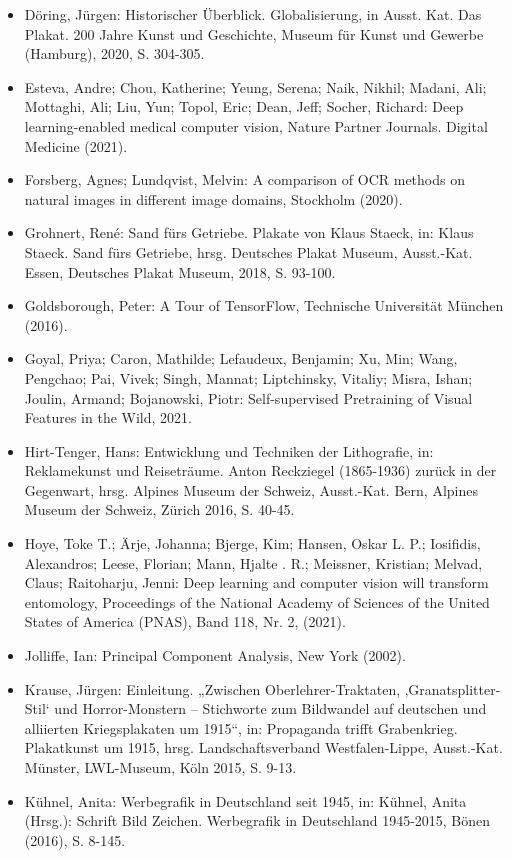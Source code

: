 \documentclass[a4paper,12pt,ngerman]{article}
\begin{document}
\begin{itemize}
	\item Döring, Jürgen: Historischer Überblick. Globalisierung, in Ausst. Kat. Das Plakat. 200 Jahre Kunst und Geschichte, Museum für Kunst und Gewerbe (Hamburg), 2020, S. 304-305.
	\item Esteva, Andre; Chou, Katherine; Yeung, Serena; Naik, Nikhil; Madani, Ali; Mottaghi, Ali; Liu, Yun; Topol, Eric; Dean, Jeff; Socher, Richard: Deep learning-enabled medical computer vision, Nature Partner Journals. Digital Medicine (2021). 
	\item Forsberg, Agnes; Lundqvist, Melvin: A comparison of OCR methods on natural images in different image domains, Stockholm (2020).
	\item Grohnert, René: Sand fürs Getriebe. Plakate von Klaus Staeck, in: Klaus Staeck. Sand fürs Getriebe, hrsg. Deutsches Plakat Museum, Ausst.-Kat. Essen, Deutsches Plakat Museum, 2018, S. 93-100.
	\item Goldsborough, Peter: A Tour of TensorFlow, Technische Universität München (2016).
	\item Goyal, Priya; Caron, Mathilde; Lefaudeux, Benjamin; Xu, Min; Wang, Pengchao; Pai, Vivek; Singh, Mannat; Liptchinsky, Vitaliy; Misra, Ishan; Joulin, Armand; Bojanowski, Piotr: Self-supervised Pretraining of Visual Features in the Wild, 2021. 
	\item Hirt-Tenger, Hans: Entwicklung und Techniken der Lithografie, in: Reklamekunst und Reiseträume. Anton Reckziegel (1865-1936) zurück in der Gegenwart, hrsg. Alpines Museum der Schweiz, Ausst.-Kat. Bern, Alpines Museum der Schweiz, Zürich 2016, S. 40-45.
	\item Hoye, Toke T.; Ärje, Johanna; Bjerge, Kim; Hansen, Oskar L. P.; Iosifidis, Alexandros; Leese, Florian; Mann, Hjalte . R.; Meissner, Kristian; Melvad, Claus; Raitoharju, Jenni: Deep learning and computer vision will transform entomology, Proceedings of the National Academy of Sciences of the United States of America (PNAS), Band 118, Nr. 2, (2021). 
	\item Jolliffe, Ian: Principal Component Analysis, New York (2002).
	\item Krause, Jürgen: Einleitung. „Zwischen Oberlehrer-Traktaten, ‚Granatsplitter-Stil‘ und Horror-Monstern – Stichworte zum Bildwandel auf deutschen und alliierten Kriegsplakaten um 1915“, in: Propaganda trifft Grabenkrieg. Plakatkunst um 1915, hrsg. Landschaftsverband Westfalen-Lippe, Ausst.-Kat. Münster, LWL-Museum, Köln 2015, S. 9-13.
	\item Kühnel, Anita: Werbegrafik in Deutschland seit 1945, in: Kühnel, Anita (Hrsg.): Schrift Bild Zeichen. Werbegrafik in Deutschland 1945-2015, Bönen (2016), S. 8-145.

\end{itemize}
\end{document}
